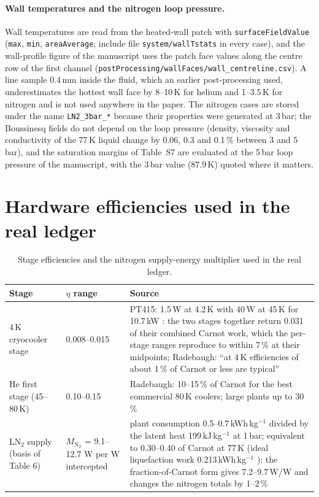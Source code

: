 \documentclass[11pt]{article}
\begin{document}
\paragraph{Wall temperatures and the nitrogen loop pressure.} Wall temperatures are read from
the heated-wall patch with \texttt{surfaceFieldValue} (\texttt{max}, \texttt{min},
\texttt{areaAverage}; include file \texttt{system/wallTstats} in every case), and the
wall-profile figure of the manuscript uses the patch face values along the centre row of the
first channel (\texttt{postProcessing/wallFaces/wall\_centreline.csv}). A line sample 0.4\,mm
inside the fluid, which an earlier post-processing used, underestimates the hottest wall face
by 8--10\,K for helium and 1--3.5\,K for nitrogen and is not used anywhere in the paper. The
nitrogen cases are stored under the name \texttt{LN2\_3bar\_*} because their properties were
generated at 3\,bar; the Boussinesq fields do not depend on the loop pressure (density,
viscosity and conductivity of the 77\,K liquid change by 0.06, 0.3 and 0.1\,\% between 3 and
5\,bar), and the saturation margins of Table~S7 are evaluated at the 5\,bar loop pressure of
the manuscript, with the 3\,bar value (87.9\,K) quoted where it matters.

\section{Hardware efficiencies used in the real ledger}
\begin{table}[H]\centering\small
\caption{Stage efficiencies and the nitrogen supply-energy multiplier used in the real ledger.}
\begin{tabularx}{\textwidth}{l l X}
\toprule
Stage & $\eta$ range & Source \\
\midrule
4\,K cryocooler stage & 0.008--0.015 & PT415: 1.5\,W at 4.2\,K with 40\,W at 45\,K for 10.7\,kW
\citep{Bluefors2026PT415}: the two stages together return 0.031 of their combined Carnot work, which the
per-stage ranges reproduce to within 7\,\% at their midpoints;
Radebaugh: ``at 4\,K efficiencies of about 1\,\% of Carnot or less are typical'' \citep{Radebaugh2009Cryocoolers} \\
He first stage (45--80\,K) & 0.10--0.15 & Radebaugh: 10--15\,\% of Carnot for the best commercial 80\,K
coolers; large plants up to 30\,\% \citep{Radebaugh2009Cryocoolers, Claudet2010LHCExergy} \\
LN$_2$ supply (basis of Table 6) & $M_{\mathrm{N_2}}$ = 9.1--12.7 W per W intercepted & plant
consumption 0.5--0.7\,kWh\,kg$^{-1}$ \citep{Karabuga2018N2Liquefaction} divided by the latent
heat 199\,kJ\,kg$^{-1}$ at 1\,bar; equivalent to 0.30--0.40 of Carnot at 77\,K (ideal
liquefaction work 0.213\,kWh\,kg$^{-1}$ \citep{BarronNellis2016Cryogenic}); the
fraction-of-Carnot form gives 7.2--9.7\,W/W and changes the nitrogen totals by 1--2\,\% \\
\bottomrule
\end{tabularx}\end{table}


\end{document}
